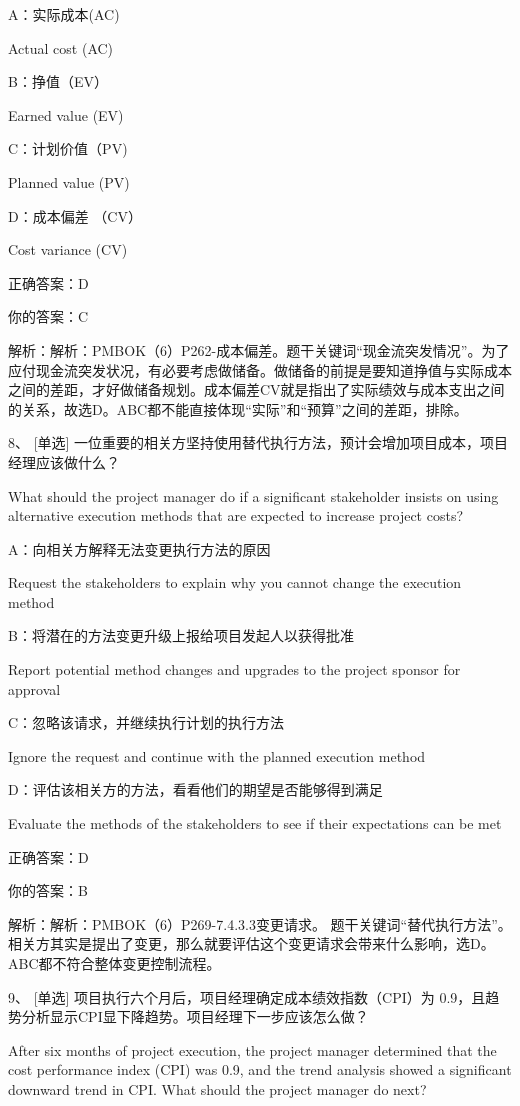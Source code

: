 A：实际成本(AC)

Actual cost (AC)

B：挣值（EV）

Earned value (EV)

C：计划价值（PV)

Planned value (PV)

D：成本偏差 （CV）

Cost variance (CV)

正确答案：D

你的答案：C

解析：解析：PMBOK（6）P262-成本偏差。题干关键词“现金流突发情况”。为了应付现金流突发状况，有必要考虑做储备。做储备的前提是要知道挣值与实际成本之间的差距，才好做储备规划。成本偏差CV就是指出了实际绩效与成本支出之间的关系，故选D。ABC都不能直接体现“实际”和“预算”之间的差距，排除。


8、 [单选] 一位重要的相关方坚持使用替代执行方法，预计会增加项目成本，项目经理应该做什么？

What should the project manager do if a significant stakeholder insists on using alternative execution methods that are expected to increase project costs?

A：向相关方解释无法变更执行方法的原因

Request the stakeholders to explain why you cannot change the execution method

B：将潜在的方法变更升级上报给项目发起人以获得批准

Report potential method changes and upgrades to the project sponsor for approval

C：忽略该请求，并继续执行计划的执行方法

Ignore the request and continue with the planned execution method

D：评估该相关方的方法，看看他们的期望是否能够得到满足

Evaluate the methods of the stakeholders to see if their expectations can be met

正确答案：D

你的答案：B

解析：解析：PMBOK（6）P269-7.4.3.3变更请求。 题干关键词“替代执行方法”。 相关方其实是提出了变更，那么就要评估这个变更请求会带来什么影响，选D。 ABC都不符合整体变更控制流程。



9、 [单选] 项目执行六个月后，项目经理确定成本绩效指数（CPI）为 0.9，且趋势分析显示CPI显下降趋势。项目经理下一步应该怎么做？

After six months of project execution, the project manager determined that the cost performance index (CPI) was 0.9, and the trend analysis showed a significant downward trend in CPI. What should the project manager do next?

